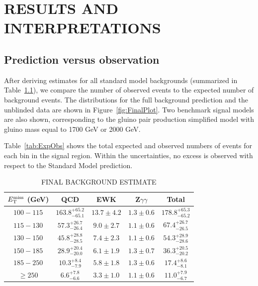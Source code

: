 \chapter{RESULTS AND INTERPRETATIONS}
\label{chap:Results}


\section{Prediction versus observation}
\label{sec:fullCount}
After deriving estimates for all standard model backgrounds (summarized in Table~\ref{tab:Exp}), we compare the number of 
observed events to the expected number of background events. 
The \ETmiss distributions for the full background prediction and the unblinded data are
shown in Figure~\ref{fig:FinalPlot}. Two benchmark signal models are also shown, 
corresponding to the gluino pair production simplified model 
 with gluino mass equal to 1700 GeV or 2000 GeV.

Table~\ref{tab:ExpObs} shows the total expected and observed numbers of events for each bin in the signal region.
Within the uncertainties, no excess is observed with respect to the Standard Model prediction.

\begin{table}[ht]
    \caption{FINAL BACKGROUND ESTIMATE}
    \centering
    \begin{tabular}{ |c|c|c|c|c|}
        \hline
        \hline
        $E_{\mathrm{T}}^{\text{miss}}$ (GeV) & QCD &  EWK &  Z$\gamma\gamma$ & Total  \\ [0.5ex]
        \hline
        \hline
        $100-115$  	& ${163.8}^{+ 65.2}_{- 65.1}$ 	& $13.7 \pm 4.2$ & $1.3 \pm 0.6$ 	& ${ 178.8 }^{+ 65.3 }_{- 65.2 }$  \\
	$115-130$ 	& ${57.3}^{+ 26.7}_{- 26.4}$ 	& $ 9.0  \pm 2.7$ & $1.1 \pm 0.6$ 	& ${ 67.4 }^{+ 26.7 }_{- 26.5 }$   \\
	$130-150$ 	& ${45.8}^{+ 28.8}_{- 28.5}$ 	& $ 7.4 \pm 2.3$  & $1.1 \pm 0.6$ 	& ${ 54.3 }^{+ 28.9 }_{- 28.6 }$   \\
	$150-185$ 	& ${28.9}^{+ 20.4}_{- 20.0}$ 	& $ 6.1 \pm 1.9$  & $1.3 \pm 0.7$ 	& ${ 36.3 }^{+ 20.5 }_{- 20.2 }$   \\
	$185-250$ 	& ${10.3}^{+ 8.4}_{- 7.9}$ 		& $ 5.8 \pm 1.8$  & $1.3 \pm 0.6$ 	& ${ 17.4 }^{+ 8.6 }_{- 8.1 }$  \\
	$\geq 250$  	& ${6.6}^{+ 7.8}_{- 6.6}$ 		& $ 3.3 \pm 1.0$ & $1.1 \pm 0.6$ 	& ${ 11.0 }^{+ 7.9 }_{- 6.7 }$  \\

        \hline
        \hline
    \end{tabular}
    \label{tab:Exp}
\end{table}


